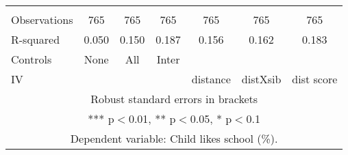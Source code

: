 \begin{tabular}{lcccccc}
 &  &  &  &  &  &  \\
Observations & 765 & 765 & 765 & 765 & 765 & 765 \\
R-squared & 0.050 & 0.150 & 0.187 & 0.156 & 0.162 & 0.183 \\
Controls & None & All & Inter &  &  &  \\
 IV &  &  &  & distance & distXsib & dist score \\ \hline
\multicolumn{7}{c}{ Robust standard errors in brackets} \\
\multicolumn{7}{c}{ *** p$<$0.01, ** p$<$0.05, * p$<$0.1} \\
\multicolumn{7}{c}{ Dependent variable: Child likes school (\%).} \\
\end{tabular}
